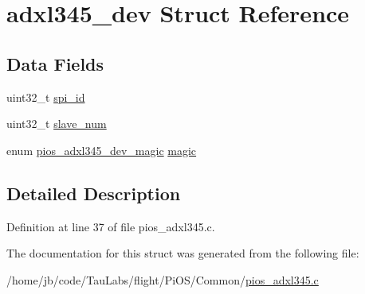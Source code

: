 \hypertarget{structadxl345__dev}{\section{adxl345\-\_\-dev \-Struct \-Reference}
\label{structadxl345__dev}
}
\subsection*{\-Data \-Fields}
\begin{DoxyCompactItemize}
\item 
uint32\-\_\-t \hyperlink{group___p_i_o_s___a_d_x_l345_ga2681cf2ea08ddf51ce6cea962e6ea9a7}{spi\-\_\-id}
\item 
uint32\-\_\-t \hyperlink{group___p_i_o_s___a_d_x_l345_ga0955d4176a279516aa3b7dcbea03965c}{slave\-\_\-num}
\item 
enum \hyperlink{group___p_i_o_s___a_d_x_l345_ga2f1fd1a4af16c722d816221da8924b5c}{pios\-\_\-adxl345\-\_\-dev\-\_\-magic} \hyperlink{group___p_i_o_s___a_d_x_l345_ga71c28fb64e7d683548f06eb171dc5cde}{magic}
\end{DoxyCompactItemize}


\subsection{\-Detailed \-Description}


\-Definition at line 37 of file pios\-\_\-adxl345.\-c.



\-The documentation for this struct was generated from the following file\-:\begin{DoxyCompactItemize}
\item 
/home/jb/code/\-Tau\-Labs/flight/\-Pi\-O\-S/\-Common/\hyperlink{pios__adxl345_8c}{pios\-\_\-adxl345.\-c}\end{DoxyCompactItemize}
